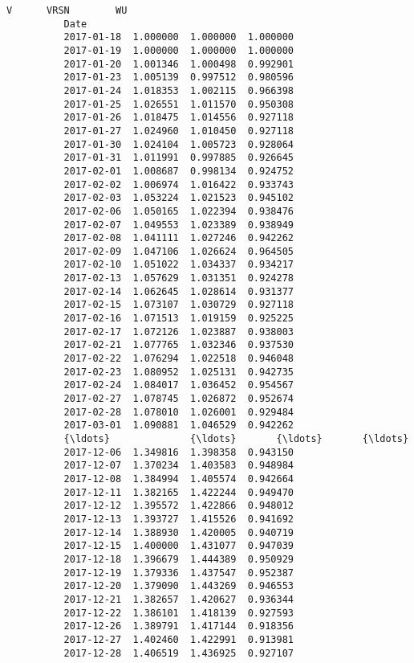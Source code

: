 \documentclass[11pt]{article}
\begin{document}
\begin{Verbatim}[commandchars=\\\{\}]
                             V      VRSN        WU  
          Date                                      
          2017-01-18  1.000000  1.000000  1.000000  
          2017-01-19  1.000000  1.000000  1.000000  
          2017-01-20  1.001346  1.000498  0.992901  
          2017-01-23  1.005139  0.997512  0.980596  
          2017-01-24  1.018353  1.002115  0.966398  
          2017-01-25  1.026551  1.011570  0.950308  
          2017-01-26  1.018475  1.014556  0.927118  
          2017-01-27  1.024960  1.010450  0.927118  
          2017-01-30  1.024104  1.005723  0.928064  
          2017-01-31  1.011991  0.997885  0.926645  
          2017-02-01  1.008687  0.998134  0.924752  
          2017-02-02  1.006974  1.016422  0.933743  
          2017-02-03  1.053224  1.021523  0.945102  
          2017-02-06  1.050165  1.022394  0.938476  
          2017-02-07  1.049553  1.023389  0.938949  
          2017-02-08  1.041111  1.027246  0.942262  
          2017-02-09  1.047106  1.026624  0.964505  
          2017-02-10  1.051022  1.034337  0.934217  
          2017-02-13  1.057629  1.031351  0.924278  
          2017-02-14  1.062645  1.028614  0.931377  
          2017-02-15  1.073107  1.030729  0.927118  
          2017-02-16  1.071513  1.019159  0.925225  
          2017-02-17  1.072126  1.023887  0.938003  
          2017-02-21  1.077765  1.032346  0.937530  
          2017-02-22  1.076294  1.022518  0.946048  
          2017-02-23  1.080952  1.025131  0.942735  
          2017-02-24  1.084017  1.036452  0.954567  
          2017-02-27  1.078745  1.026872  0.952674  
          2017-02-28  1.078010  1.026001  0.929484  
          2017-03-01  1.090881  1.046529  0.942262  
          {\ldots}              {\ldots}       {\ldots}       {\ldots}  
          2017-12-06  1.349816  1.398358  0.943150  
          2017-12-07  1.370234  1.403583  0.948984  
          2017-12-08  1.384994  1.405574  0.942664  
          2017-12-11  1.382165  1.422244  0.949470  
          2017-12-12  1.395572  1.422866  0.948012  
          2017-12-13  1.393727  1.415526  0.941692  
          2017-12-14  1.388930  1.420005  0.940719  
          2017-12-15  1.400000  1.431077  0.947039  
          2017-12-18  1.396679  1.444389  0.950929  
          2017-12-19  1.379336  1.437547  0.952387  
          2017-12-20  1.379090  1.443269  0.946553  
          2017-12-21  1.382657  1.420627  0.936344  
          2017-12-22  1.386101  1.418139  0.927593  
          2017-12-26  1.389791  1.417144  0.918356  
          2017-12-27  1.402460  1.422991  0.913981  
          2017-12-28  1.406519  1.436925  0.927107  

\end{Verbatim}
\end{document}
